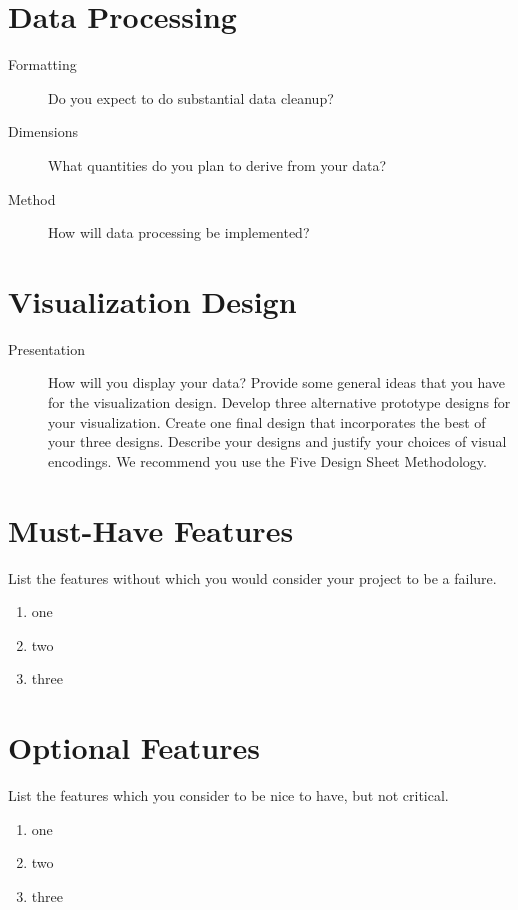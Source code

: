 \documentclass[12pt]{article}
\begin{document}
\section{Data Processing}
\begin{description}
\item [Formatting] Do you expect to do substantial data cleanup? 
\item [Dimensions] What quantities do you plan to derive from your data?
\item [Method] How will data processing be implemented?
\end{description}
  
  
  \section{Visualization Design}
  \begin{description}
  \item [Presentation]  How will you display your data? Provide some general ideas that you have for the visualization design. Develop three alternative prototype designs for your visualization. Create one final design that incorporates the best of your three designs. Describe your designs and justify your choices of visual encodings. We recommend you use the Five Design Sheet Methodology.
  \end{description}
  
\section{Must-Have Features}

 List the features without which you would consider your project to be a failure.
 
 \begin{enumerate}
 \item one
 \item two
 \item three
 \end{enumerate}
 
 \section{Optional Features}
 List the features which you consider to be nice to have, but not critical.
  \begin{enumerate}
 \item one
 \item two
 \item three
 \end{enumerate}
 
\end{document}
